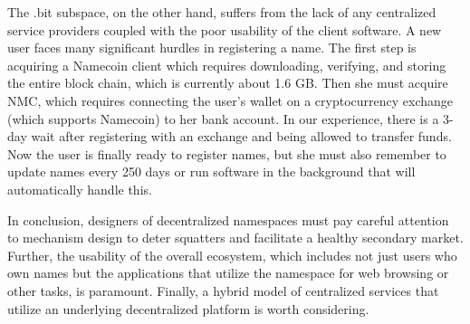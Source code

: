 The .bit subspace, on the other hand, suffers from the lack of any centralized service providers coupled with the poor usability of the client software. A new user faces many significant hurdles in registering a name. The first step is acquiring a Namecoin client which requires downloading, verifying, and storing the entire block chain, which is currently about 1.6 GB. Then she must acquire NMC, which requires connecting the user's wallet on a cryptocurrency exchange (which supports Namecoin) to her bank account. In our experience, there is a 3-day wait after registering with an exchange and being allowed to transfer funds. Now the user is finally ready to register names, but she must also remember to update names every 250 days or run software in the background that will automatically handle this.

In conclusion, designers of decentralized namespaces must pay careful attention to mechanism design to deter squatters and facilitate a healthy secondary market. Further, the usability of the overall ecosystem, which includes not just users who own names but the applications that utilize the namespace for web browsing or other tasks, is paramount. Finally, a hybrid model of centralized services that utilize an underlying decentralized platform is worth considering.

